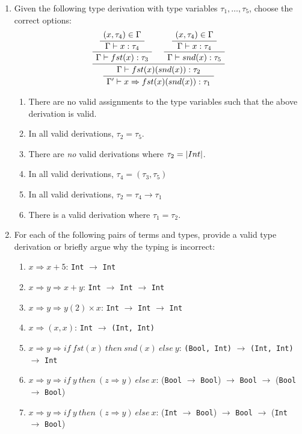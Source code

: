 \begin{exercise}{}
  \pagebreak

  \begin{enumerate}
    \item Given the following type derivation with type variables \(\tau_1,
    \ldots, \tau_5\), choose the correct options:
    \begin{equation*}
      \AxiomC{\((x, \tau_4) \in \Gamma\)}
      \UnaryInfC{\(\Gamma \vdash x: \tau_4\)}
      \UnaryInfC{\(\Gamma \vdash fst(x): \tau_3\)}
      \AxiomC{\((x, \tau_4) \in \Gamma\)}
      \UnaryInfC{\(\Gamma \vdash x: \tau_4\)}
      \UnaryInfC{\(\Gamma \vdash snd(x): \tau_5\)}
      \BinaryInfC{\(\Gamma \vdash fst(x)(snd(x)) : \tau_2\)}
      \UnaryInfC{\(\Gamma' \vdash x \Rightarrow fst(x)(snd(x)): \tau_1\)}
      \DisplayProof
    \end{equation*}

    \begin{enumerate}
      \item There are no valid assignments to the type variables such that the
      above derivation is valid.
      \item In all valid derivations, \(\tau_2 = \tau_5\).
      \item There are \emph{no} valid derivations where \(\tau_2 = \lstinline|Int|\).
      \item In all valid derivations, \(\tau_4 = (\tau_3, \tau_5)\)
      \item In all valid derivations, \(\tau_2 = \tau_4 \to \tau_1\)
      \item There is a valid derivation where \(\tau_1 = \tau_2\).
    \end{enumerate}
    \item For each of the following pairs of terms and types, provide a valid
    type derivation or briefly argue why the typing is incorrect:
    \begin{enumerate}
      \item \(x \Rightarrow x + 5\): \lstinline|Int| \(\to\) \lstinline|Int|
      \item \(x \Rightarrow y \Rightarrow x + y\): \lstinline|Int| \(\to\)
      \lstinline|Int| \(\to\) \lstinline|Int|
      \item \(x \Rightarrow y \Rightarrow y(2) \times x\): \lstinline|Int| \(\to\)
      \lstinline|Int| \(\to\) \lstinline|Int|
      \item \(x \Rightarrow (x, x)\): \lstinline|Int| \(\to\) \lstinline|(Int, Int)|
      \item \(x \Rightarrow y \Rightarrow if ~fst(x) ~then ~snd(x) ~else~ y\): \lstinline|(Bool, Int)| \(\to\) \lstinline|(Int, Int)| \(\to\) \lstinline|Int|
      \item \(x \Rightarrow y \Rightarrow if ~y~ then~ (z \Rightarrow y) ~else~ x \): (\lstinline|Bool| \(\to\) \lstinline|Bool|) \(\to\) \lstinline|Bool| \(\to\) (\lstinline|Bool| \(\to\) \lstinline|Bool|)
      \item \(x \Rightarrow y \Rightarrow if ~y~ then~ (z \Rightarrow y) ~else~ x \): (\lstinline|Int| \(\to\) \lstinline|Bool|) \(\to\) \lstinline|Bool| \(\to\) (\lstinline|Int| \(\to\) \lstinline|Bool|)
    \end{enumerate}


\end{enumerate}
\end{exercise}
